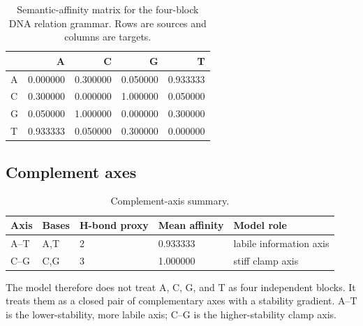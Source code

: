 \documentclass[11pt]{article}
\begin{document}
\begin{table}[h]
\centering
\caption{Semantic-affinity matrix for the four-block DNA relation grammar. Rows are sources and columns are targets.}
\label{tab:matrix}
\begin{tabular}{lrrrr}
\toprule
 & A & C & G & T \\
\midrule
A & 0.000000 & 0.300000 & 0.050000 & 0.933333 \\
C & 0.300000 & 0.000000 & 1.000000 & 0.050000 \\
G & 0.050000 & 1.000000 & 0.000000 & 0.300000 \\
T & 0.933333 & 0.050000 & 0.300000 & 0.000000 \\
\bottomrule
\end{tabular}
\end{table}

\subsection{Complement axes}
\begin{table}[h]
\centering
\caption{Complement-axis summary.}
\label{tab:axes}
\begin{tabular}{lllll}
\toprule
Axis & Bases & H-bond proxy & Mean affinity & Model role \\
\midrule
A--T & A,T & 2 & 0.933333 & labile information axis \\
C--G & C,G & 3 & 1.000000 & stiff clamp axis \\
\bottomrule
\end{tabular}
\end{table}

The model therefore does not treat A, C, G, and T as four independent blocks. It treats them as a closed pair of complementary axes with a stability gradient. A--T is the lower-stability, more labile axis; C--G is the higher-stability clamp axis.
\end{document}
